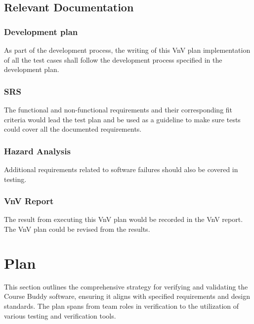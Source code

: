 \documentclass[12pt, titlepage]{article}
\begin{document}
\subsection{Relevant Documentation}
\subsubsection{Development plan}
As part of the development process, the writing of this VnV plan implementation of all the test cases shall follow the development process specified in the development plan.

\subsubsection{SRS}
The functional and non-functional requirements and their corresponding fit criteria would lead the test plan and be used as a guideline to make sure tests could cover all the documented requirements.
\subsubsection{Hazard Analysis}
Additional requirements related to software failures should also be covered in testing.
\subsubsection{VnV Report}
The result from executing this VnV plan would be recorded in the VnV report.  The VnV plan could be revised from the results.
\section{Plan}

This section outlines the comprehensive strategy for verifying and validating the Course Buddy software, ensuring it aligns with specified requirements and design standards. The plan spans from team roles in verification to the utilization of various testing and verification tools.
\end{document}
